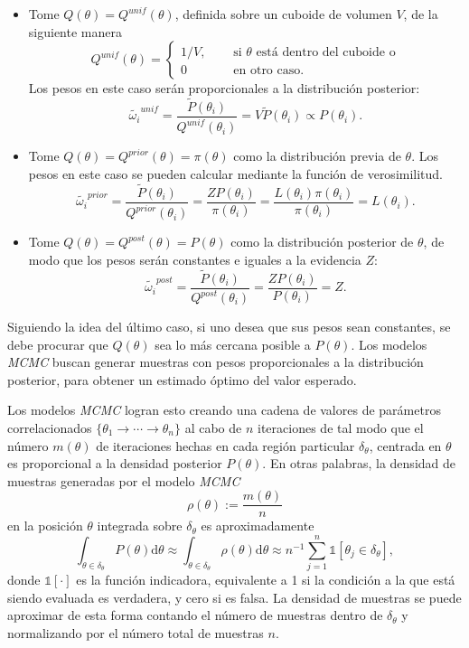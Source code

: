 	\begin{itemize}
		\item Tome $Q(\theta)=Q^{unif}(\theta)$, definida sobre un cuboide de volumen $V$, de la siguiente manera
		\[   
Q^{unif}(\theta) = 
     \begin{cases}
		1/V, &\quad\text{ si }\theta\text{ está dentro del cuboide o}\\
		0	&\quad\text{ en otro caso.}
     \end{cases}
\]
Los pesos en este caso serán proporcionales a la distribución posterior:
$$\tilde{\omega_i}^{unif}=\frac{\tilde{P}(\theta_i)}{Q^{unif}(\theta_i)}=V\tilde{P}(\theta_i)\propto P(\theta_i).$$
	\item Tome $Q(\theta)=Q^{prior}(\theta)=\pi(\theta)$ como la distribución previa de $\theta$. Los pesos en este caso se pueden calcular mediante la función de verosimilitud.
	$$\tilde{\omega_i}^{prior}=\frac{\tilde{P}(\theta_i)}{Q^{prior}(\theta_i)}=\frac{ZP(\theta_i)}{\pi(\theta_i)}=\frac{L(\theta_i)\pi(\theta_i)}{\pi(\theta_i)}=L(\theta_i).$$
	\item Tome $Q(\theta)=Q^{post}(\theta)=P(\theta)$ como la distribución posterior de $\theta$, de modo que los pesos serán constantes e iguales a la evidencia $Z$:
	$$\tilde{\omega_i}^{post}=\frac{\tilde{P}(\theta_i)}{Q^{post}(\theta_i)}=\frac{ZP(\theta_i)}{P(\theta_i)}=Z.$$
	\end{itemize}
	Siguiendo la idea del último caso, si uno desea que sus pesos sean constantes, se debe procurar que $Q(\theta)$ sea lo más cercana posible a $P(\theta)$. Los modelos \textit{MCMC} buscan generar muestras con pesos proporcionales a la distribución posterior, para obtener un estimado óptimo del valor esperado.
	
	Los modelos \textit{MCMC} logran esto creando una cadena de valores de parámetros correlacionados $\{\theta_1\rightarrow\cdots\rightarrow\theta_n\}$ al cabo de $n$ iteraciones de tal modo que el número $m(\theta)$ de iteraciones hechas en cada región particular $\delta_\theta$, centrada en $\theta$ es proporcional a la densidad posterior $P(\theta)$. En otras palabras, la densidad de muestras generadas por el modelo \textit{MCMC}
	$$\rho(\theta):=\frac{m(\theta)}{n}$$
	en la posición $\theta$ integrada sobre $\delta_\theta$ es aproximadamente
	$$\int_{\theta\in\delta_\theta}P(\theta)\mathrm{d}\theta\approx \int_{\theta\in\delta_\theta}\rho(\theta)\mathrm{d}\theta\approx n^{-1}\sum_{j=1}^n\mathbb{1}[\theta_j\in\delta_\theta],$$
	donde $\mathbb{1}[\cdot]$ es la función indicadora, equivalente a 1 si la condición a la que está siendo evaluada es verdadera, y cero si es falsa. La densidad de muestras se puede aproximar de esta forma contando el número de muestras dentro de $\delta_\theta$ y normalizando por el número total de muestras $n$.
	
